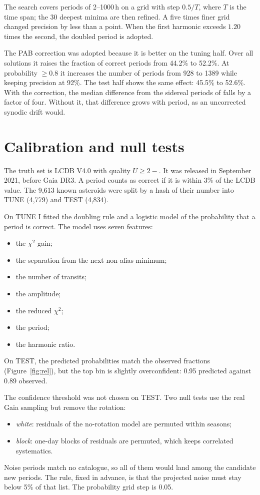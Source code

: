 The search covers periods of 2--1000\,h on a grid with step $0.5/T$, where $T$ is the time span; the 30
deepest minima are then refined. A five times finer grid changed precision by less than a point. When the
first harmonic exceeds $1.20$ times the second, the doubled period is adopted.

The PAB correction was adopted because it is better on the tuning half. Over all solutions it raises the
fraction of correct periods from 44.2\% to 52.2\%. At probability $\ge0.8$ it increases the number of
periods from 928 to 1389 while keeping precision at 92\%. The test half shows the same effect: 45.5\% to
52.6\%. With the correction, the median difference from the sidereal periods of \citet{Durech2023} falls
by a factor of four. Without it, that difference grows with period, as an uncorrected synodic drift would.

\section{Calibration and null tests}

The truth set is LCDB V4.0 \citep{Warner2009,Warner2021} with quality $U\ge2-$. It was released in
September 2021, before Gaia DR3. A period counts as correct if it is within 3\% of the LCDB value. The
9{,}613 known asteroids were split by a hash of their number into TUNE (4{,}779) and TEST (4{,}834).

On TUNE I fitted the doubling rule and a logistic model of the probability that a period is correct. The
model uses seven features:
\begin{itemize}
\item the $\chi^2$ gain;
\item the separation from the next non-alias minimum;
\item the number of transits;
\item the amplitude;
\item the reduced $\chi^2$;
\item the period;
\item the harmonic ratio.
\end{itemize}
On TEST, the predicted probabilities match the observed fractions (Figure~\ref{fig:rel}), but the top bin is
slightly overconfident: 0.95 predicted against 0.89 observed.

The confidence threshold was not chosen on TEST. Two null tests use the real Gaia sampling but remove the
rotation:
\begin{itemize}
\item \emph{white}: residuals of the no-rotation model are permuted within seasons;
\item \emph{block}: one-day blocks of residuals are permuted, which keeps correlated systematics.
\end{itemize}
Noise periods match no catalogue, so all of them would land among the candidate new periods. The rule,
fixed in advance, is that the projected noise must stay below 5\% of that list. The probability grid
step is 0.05.

